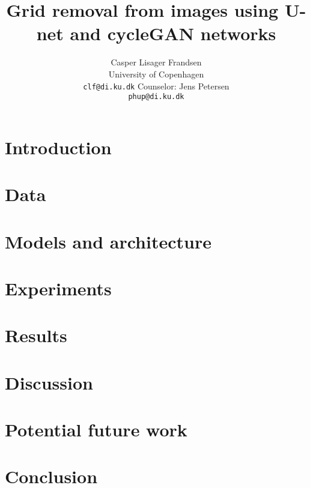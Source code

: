 \documentclass{article}
\title{Grid removal from images using U-net and cycleGAN networks}
\author{Casper Lisager Frandsen\\
  University of Copenhagen\\
  \texttt{clf@di.ku.dk}
  \AND
  Counselor: Jens Petersen\\
  \texttt{phup@di.ku.dk}
}
\begin{document}
\maketitle
\tableofcontents
\newpage



\section{Introduction}


\section{Data}


\section{Models and architecture}


\section{Experiments}

\section{Results}


\section{Discussion}


\section{Potential future work}


\section{Conclusion}




\end{document}
